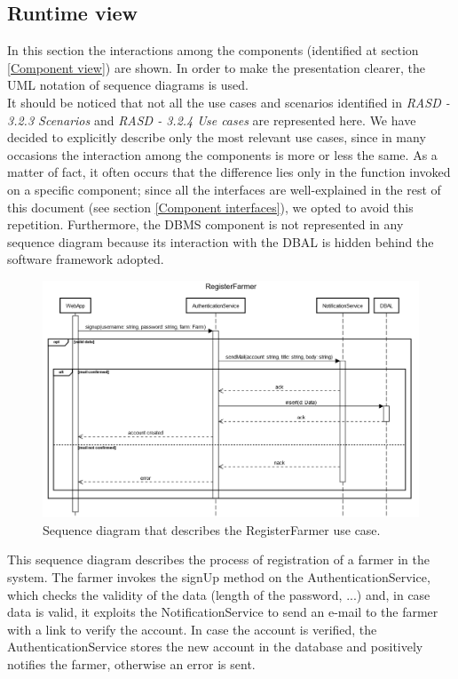 \documentclass{article}
\begin{document}
\subsection{Runtime view}
In this section the interactions among the components (identified at section \ref{Component view}) are shown. In order to make the presentation clearer, the UML notation of sequence diagrams is used.\\ It should be noticed that not all the use cases and scenarios identified in \textit{RASD - 3.2.3 Scenarios} and \textit{RASD - 3.2.4 Use cases} are represented here. We have decided to explicitly describe only the most relevant use cases, since in many occasions the interaction among the components is more or less the same. As a matter of fact, it often occurs that the difference lies only in the function invoked on a specific component; since all the interfaces are well-explained in the rest of this document (see section \ref{Component interfaces}), we opted to avoid this repetition.
Furthermore, the DBMS component is not represented in any sequence diagram because its interaction with the DBAL is hidden behind the software framework adopted.
\newpage
\begin{figure}[H]
   \centering
   \includegraphics[scale=0.40]{diagrams/sequence diagrams/RegisterFarmer.png}
    \caption{Sequence diagram that describes the RegisterFarmer use case.}
\end{figure}
This sequence diagram describes the process of registration of a farmer in the system. The farmer invokes the signUp method on the AuthenticationService, which checks the validity of the data (length of the password, ...) and, in case data is valid, it exploits the NotificationService to send an e-mail to the farmer with a link to verify the account. In case the account is verified, the AuthenticationService stores the new account in the database and positively notifies the farmer, otherwise an error is sent.
\end{document}
